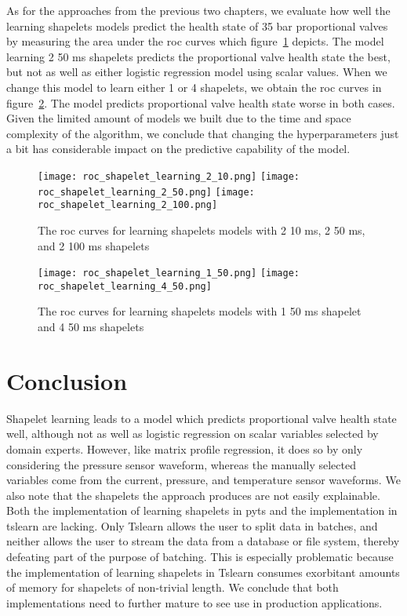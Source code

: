 As for the approaches from the previous two chapters, we evaluate how well the learning shapelets models predict the health state of 35 bar proportional valves by measuring the area under the \acrshort{roc} curves which figure~\ref{fig:roc-shapelet-learning} depicts.
The model learning 2 50 ms shapelets predicts the proportional valve health state the best, but not as well as either logistic regression model using scalar values.
When we change this model to learn either 1 or 4 shapelets, we obtain the \acrshort{roc} curves in figure~\ref{fig:roc-shapelet-learning-50}.
The model predicts proportional valve health state worse in both cases.
Given the limited amount of models we built due to the time and space complexity of the algorithm, we conclude that changing the hyperparameters just a bit has considerable impact on the predictive capability of the model.

\begin{figure}
  \begin{center}
  \texttt{[image: roc\_shapelet\_learning\_2\_10.png]}
  \texttt{[image: roc\_shapelet\_learning\_2\_50.png]}
  \texttt{[image: roc\_shapelet\_learning\_2\_100.png]}
  \end{center}
  \caption{The \acrshort{roc} curves for learning shapelets models with 2 10 ms, 2 50 ms, and 2 100 ms shapelets}
  \label{fig:roc-shapelet-learning}
\end{figure}

\begin{figure}
  \begin{center}
  \texttt{[image: roc\_shapelet\_learning\_1\_50.png]}
  \texttt{[image: roc\_shapelet\_learning\_4\_50.png]}
  \end{center}
  \caption{The \acrshort{roc} curves for learning shapelets models with 1 50 ms shapelet and 4 50 ms shapelets}
  \label{fig:roc-shapelet-learning-50}
\end{figure}

\section{Conclusion}

Shapelet learning leads to a model which predicts proportional valve health state well, although not as well as logistic regression on scalar variables selected by domain experts.
However, like matrix profile regression, it does so by only considering the pressure sensor waveform, whereas the manually selected variables come from the current, pressure, and temperature sensor waveforms.
We also note that the shapelets the approach produces are not easily explainable.
Both the implementation of learning shapelets in pyts and the implementation in tslearn are lacking.
Only Tslearn allows the user to split data in batches, and neither allows the user to stream the data from a database or file system, thereby defeating part of the purpose of batching.
This is especially problematic because the implementation of learning shapelets in Tslearn consumes exorbitant amounts of memory for shapelets of non-trivial length.
We conclude that both implementations need to further mature to see use in production applications.

